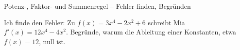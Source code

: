 \begin{aufgabe}{Potenz-, Faktor- und Summenregel – Fehler finden, Begründen}
\begin{teile}
\teil Ich finde den Fehler: Zu $f(x) = 3x^4 - 2x^2 + 6$ schreibt Mia $f'(x) = 12x^4 - 4x^2$.
\teil Begründe, warum die Ableitung einer Konstanten, etwa $f(x) = 12$, null ist.
\end{teile}
\end{aufgabe}
